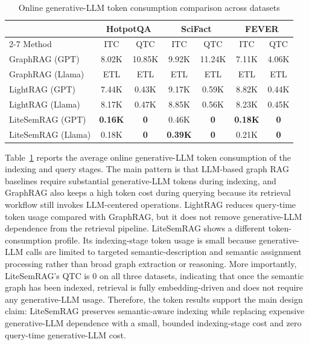 \documentclass[conference]{IEEEtran}
\begin{document}
\begin{table}[t]
\centering
\small
\setlength{\tabcolsep}{6pt}
\caption{Online generative-LLM token consumption comparison across datasets}
\label{tab:token_results}
\begin{tabular}{lcccccc}
\hline
                 & \multicolumn{2}{c}{HotpotQA} & \multicolumn{2}{c}{SciFact} & \multicolumn{2}{c}{FEVER} \\ \cline{2-7}
Method           & ITC           & QTC          & ITC          & QTC          & ITC         & QTC         \\ \hline
GraphRAG (GPT)   & 8.02K         & 10.85K       & 9.92K        & 11.24K       & 7.11K       & 4.06K       \\
GraphRAG (Llama) & ETL           & ETL          & ETL          & ETL          & ETL         & ETL         \\
LightRAG (GPT)   & 7.44K         & 0.43K        & 9.17K        & 0.59K        & 8.82K       & 0.44K       \\
LightRAG (Llama) & 8.17K         & 0.47K        & 8.85K        & 0.56K        & 8.23K       & 0.45K       \\
LiteSemRAG (GPT)   & \textbf{0.16K}    & \textbf{0}   & 0.46K   & \textbf{0}   & \textbf{0.18K}  & \textbf{0}  \\
LiteSemRAG (Llama) & 0.18K    & \textbf{0}   & \textbf{0.39K}   & \textbf{0}   & 0.21K  & \textbf{0}  \\ \hline
\end{tabular}

\end{table}
Table~\ref{tab:token_results} reports the average online generative-LLM token consumption of the indexing and query stages. The main pattern is that LLM-based graph RAG baselines require substantial generative-LLM tokens during indexing, and GraphRAG also keeps a high token cost during querying because its retrieval workflow still invokes LLM-centered operations. LightRAG reduces query-time token usage compared with GraphRAG, but it does not remove generative-LLM dependence from the retrieval pipeline. LiteSemRAG shows a different token-consumption profile. Its indexing-stage token usage is small because generative-LLM calls are limited to targeted semantic-description and semantic assignment processing rather than broad graph extraction or reasoning. More importantly, LiteSemRAG's QTC is 0 on all three datasets, indicating that once the semantic graph has been indexed, retrieval is fully embedding-driven and does not require any generative-LLM usage. Therefore, the token results support the main design claim: LiteSemRAG preserves semantic-aware indexing while replacing expensive generative-LLM dependence with a small, bounded indexing-stage cost and zero query-time generative-LLM cost.
\end{document}
